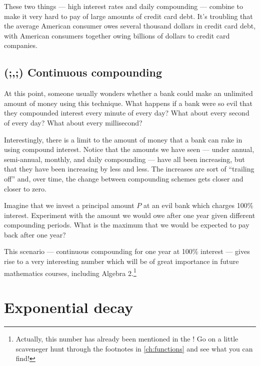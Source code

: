 These two things --- high interest rates and daily compounding --- combine to make it very hard to pay of large amounts of credit card debt. It's troubling that the average American consumer owes several thousand dollars in credit card debt, with American consumers together owing billions of dollars to credit card companies.


\subsection{(;,;) Continuous compounding}

At this point, someone usually wonders whether a bank could make an unlimited amount of money using this technique. What happens if a bank were so evil that they compounded interest every minute of every day? What about every second of every day? What about every millisecond?

Interestingly, there is a limit to the amount of money that a bank can rake in using compound interest. Notice that the amounts we have seen --- under annual, semi-annual, monthly, and daily compounding --- have all been increasing, but that they have been increasing by less and less. The increases are sort of ``trailing off'' and, over time, the change between compounding schemes gets closer and closer to zero.

\begin{boxedexplore}
Imagine that we invest a principal amount $P$ at an evil bank which charges 100\% interest. Experiment with the amount we would owe after one year given different compounding periods. What is the maximum that we would be expected to pay back after one year?
\end{boxedexplore}


This scenario --- continuous compounding for one year at 100\% interest --- gives rise to a very interesting number which will be of great importance in future mathematics courses, including Algebra 2.\footnote{Actually, this number has already been mentioned in the \algebranomicon! Go on a little scaveneger hunt through the footnotes in \cref{ch:functions} and see what you can find!}

\section{Exponential decay}
\label{sec:expodecay}

